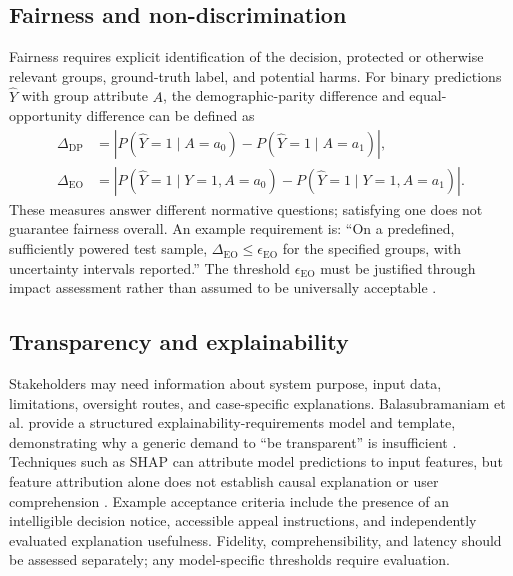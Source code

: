 \documentclass[11pt,a4paper]{article}
\begin{document}
\subsection{Fairness and non-discrimination}
Fairness requires explicit identification of the decision, protected or otherwise relevant groups, ground-truth label, and potential harms. For binary predictions $\hat Y$ with group attribute $A$, the demographic-parity difference and equal-opportunity difference can be defined as
\begin{align}
\Delta_{\mathrm{DP}}&=\left|P(\hat Y=1\mid A=a_0)-P(\hat Y=1\mid A=a_1)\right|,\\
\Delta_{\mathrm{EO}}&=\left|P(\hat Y=1\mid Y=1,A=a_0)-P(\hat Y=1\mid Y=1,A=a_1)\right|.
\end{align}
These measures answer different normative questions; satisfying one does not guarantee fairness overall. An example requirement is: ``On a predefined, sufficiently powered test sample, $\Delta_{\mathrm{EO}}\leq\epsilon_{\mathrm{EO}}$ for the specified groups, with uncertainty intervals reported.'' The threshold $\epsilon_{\mathrm{EO}}$ must be justified through impact assessment rather than assumed to be universally acceptable \cite{mehrabi2021,kleinberg2017}.

\subsection{Transparency and explainability}
Stakeholders may need information about system purpose, input data, limitations, oversight routes, and case-specific explanations. Balasubramaniam et al. provide a structured explainability-requirements model and template, demonstrating why a generic demand to ``be transparent'' is insufficient \cite{balasubramaniam2023}. Techniques such as SHAP can attribute model predictions to input features, but feature attribution alone does not establish causal explanation or user comprehension \cite{arrieta2020,lundberg2017}. Example acceptance criteria include the presence of an intelligible decision notice, accessible appeal instructions, and independently evaluated explanation usefulness. Fidelity, comprehensibility, and latency should be assessed separately; any model-specific thresholds require evaluation.
\end{document}
